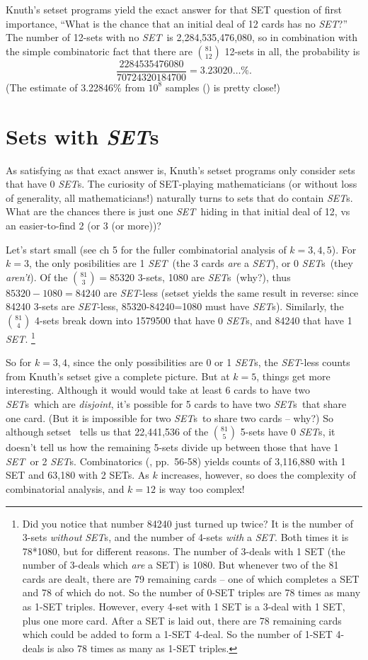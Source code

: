\documentclass{article}
\theoremstyle{theorem}
\theoremstyle{definition}
\newcommand{\SET}{{\em SET}}
\newcommand{\SETs}{{\em SET}s}
\newcommand{\SETSETb}{{\sc setset }}
\begin{document}
Knuth's \SETSETb programs yield the exact answer for that SET question of first
importance, ``What is the chance that an initial deal of 12 cards has no \SET?''
The number of 12-sets with no \SET~is 2,284,535,476,080, so in combination with
the simple combinatoric fact that there are $\binom{81}{12}$ 12-sets in all, the
probability is
$$\frac{2284535476080}{70724320184700} = 3.23020\ldots\%.$$
(The estimate of 3.22846\% from $10^8$ samples (\cite{JOS}) is pretty close!)

\section{Sets with \SETs}
As satisfying as that exact answer is, Knuth's \SETSETb programs only consider
sets that have 0 \SETs. The curiosity of SET-playing mathematicians (or without
loss of generality, all mathematicians!) naturally turns to sets that do contain
\SETs. What are the chances there is just one \SET~hiding in that initial deal
of 12, vs an easier-to-find 2 (or 3 (or more))?

Let's start small (see \cite{JOS} ch 5 for the fuller combinatorial analysis of
$k=3,4,5$). For $k=3$, the only posibilities are 1 \SET~(the 3 cards {\em are}
a \SET), or 0 \SETs~(they {\em aren't}). Of the $\binom{81}{3}=85320$ 3-sets,
1080 are \SETs~(why?), thus $85320-1080=84240$ are \SET-less (\SETSETb yields
the same result in reverse: since 84240 3-sets are \SET-less, 85320-84240=1080
must have \SETs). Similarly, the $\binom{81}{4}$ 4-sets break down into 1579500
that have 0 \SETs, and 84240 that have 1 \SET.
\footnote{Did you notice that number 84240 just turned up twice? It is the
number of 3-sets {\em without} \SETs, and the number of 4-sets {\em with} a
\SET. Both times it is 78*1080, but for different reasons.  The number of
3-deals with 1 SET (the number of 3-deals which {\em are} a SET) is 
1080. But whenever two of the 81 cards are dealt, there are 79 remaining cards
-- one of which completes a SET and 78 of which do not. So the number of 0-SET
triples are 78 times as many as 1-SET triples. However, every 4-set with 1 SET
is a 3-deal with 1 SET, plus one more card. After a SET is laid out, there are
78 remaining cards which could be added to form a 1-SET 4-deal. So the number of
1-SET 4-deals is also 78 times as many as 1-SET triples.}

So for $k=3,4$, since the only possibilities are 0 or 1 \SETs, the \SET-less
counts from Knuth's \SETSETb give a complete picture. But at $k=5$, things get
more interesting. Although it would would take at least 6 cards to have two
\SETs~which are {\em disjoint}, it's possible for 5 cards to have two \SETs~that
share one card. (But it is impossible for two \SETs~to share two cards -- why?)
So although \SETSETb~tells us that 22,441,536 of the $\binom{81}{5}$ 5-sets have
0 \SETs, it doesn't tell us how the remaining 5-sets divide up between those
that have 1 \SET~or 2 \SETs. Combinatorics (\cite{JOS}, pp.~56-58) yields counts
of 3,116,880 with 1 SET and 63,180 with 2 SETs. As $k$ increases, however, so
does the complexity of combinatorial analysis, and $k=12$ is way too complex!
\end{document}
